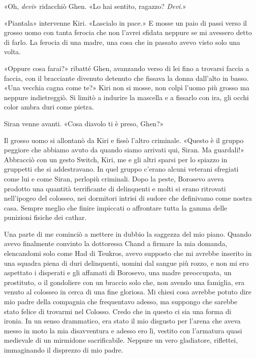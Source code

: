 «Oh, \emph{devi}» ridacchiò Ghen. «Lo hai sentito, ragazzo?
\emph{Devi}.»

«Piantala» intervenne Kiri. «Lascialo in pace.» E mosse un paio di passi
verso il grosso uomo con tanta ferocia che non l'avrei sfidata neppure
se mi avessero detto di farlo. La ferocia di una madre, una cosa che in
passato avevo visto solo una volta.

«Oppure cosa farai?» ribatté Ghen, avanzando verso di lei fino a
trovarsi faccia a faccia, con il bracciante divenuto detenuto che
fissava la donna dall'alto in basso. «Una vecchia cagna come te?» Kiri
non si mosse, non colpì l'uomo più grosso ma neppure indietreggiò. Si
limitò a indurire la mascella e a fissarlo con ira, gli occhi color
ambra duri come pietra.

Siran venne avanti. «Cosa diavolo ti è preso, Ghen?»

Il grosso uomo si allontanò da Kiri e fissò l'altro criminale. «Questo è
il gruppo peggiore che abbiamo avuto da quando siamo arrivati qui,
Siran. Ma guardali!» Abbracciò con un gesto Switch, Kiri, me e gli altri
sparsi per lo spiazzo in gruppetti che si addestravano. In quel gruppo
c'erano alcuni veterani sfregiati come lui e come Siran, perlopiù
criminali. Dopo la peste, Borosevo aveva prodotto una quantità
terrificante di delinquenti e molti si erano ritrovati nell'ipogeo del
colosseo, nei dormitori intrisi di sudore che definivamo come nostra
casa. Sempre meglio che finire impiccati o affrontare tutta la gamma
delle punizioni fisiche dei cathar.

Una parte di me cominciò a mettere in dubbio la saggezza del mio piano.
Quando avevo finalmente convinto la dottoressa Chand a firmare la mia
domanda, elencandomi solo come Had di Teukros, avevo supposto che mi
avrebbe inserito in una squadra piena di duri delinquenti, uomini dal
sangue più rozzo, e non mi ero aspettato i disperati e gli affamati di
Borosevo, una madre preoccupata, un prostituto, o il gondoliere con un
braccio solo che, non avendo una famiglia, era venuto al colosseo in
cerca di una fine gloriosa. Mi chiesi cosa avrebbe potuto dire mio padre
della compagnia che frequentavo adesso, ma suppongo che sarebbe stato
felice di trovarmi nel Colosso. Credo che in questo ci sia una forma di
ironia. In un senso drammatico, era stato il mio disgusto per l'arena
che aveva messo in moto la mia disavventura e adesso ero lì, vestito con
l'armatura quasi medievale di un mirmidone sacrificabile. Neppure un
vero gladiatore, riflettei, immaginando il disprezzo di mio padre.

